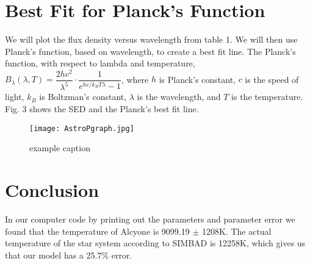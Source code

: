 \documentclass[%
 reprint,
 amsmath,amssymb,
 aps,
]{revtex4-1}
\begin{document}
\section{\label{sec:level3}Best Fit for Planck's Function}
We will plot the flux density versus wavelength from table 1. We will then use Planck's function, based on wavelength, to create a best fit line. The Planck's function, with respect to lambda and temperature, $B_\lambda(\lambda,T)=\dfrac{2hc^{2}}{\lambda^{5}}\cdot \dfrac{1}{{e^{hc/k_BT\lambda}-1}}$, where $h$ is Planck's constant, $c$ is the speed of light, $k_B$ is Boltzman's constant, $\lambda$ is the wavelength, and $T$ is the temperature. Fig. 3 shows the SED and the Planck's best fit line. 

\begin{figure}[htbp] %
   \centering
   \texttt{[image: AstroPgraph.jpg]} 
   \caption{example caption}
   \label{fig:example}
\end{figure}

\section{\label{sec:level4}Conclusion}
In our computer code by printing out the parameters and parameter error we found that the temperature of Alcyone is 9099.19 $\pm$ 1208K. The actual temperature of the star system according to SIMBAD is 12258K, which gives us that our model has a 25.7\% error.
\end{document}
